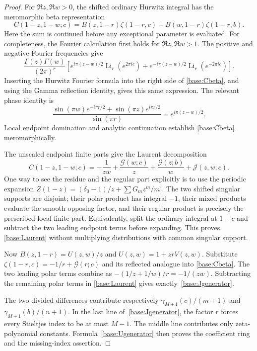 \begin{proof}
For $\Re z,\Re w>0$, the shifted ordinary Hurwitz integral has the
meromorphic beta representation
\begin{equation}\label{base:Cbeta}
 C(1-z,1-w;c)=B(z,1-r)\zeta(1-r,c)
                  +B(w,1-r)\zeta(1-r,b).
\end{equation}
Here the sum is continued before any exceptional parameter is evaluated.
For completeness, the Fourier calculation first holds for
$\Re z,\Re w>1$.  The positive and negative Fourier frequencies give
\[
 \frac{\Gamma(z)\Gamma(w)}{(2\pi)^r}
 \left[e^{i\pi(z-w)/2}\operatorname{Li}_r(e^{2\pi ic})
       +e^{-i\pi(z-w)/2}\operatorname{Li}_r(e^{-2\pi ic})\right].
\]
Inserting the Hurwitz Fourier formula into the right side of
\eqref{base:Cbeta}, and using the Gamma reflection identity, gives this
same expression.  The relevant phase identity is
\[
 \frac{\sin(\pi w)e^{-i\pi r/2}
             +\sin(\pi z)e^{i\pi r/2}}{\sin(\pi r)}
       =e^{i\pi(z-w)/2}.
\]
Local endpoint domination and analytic continuation establish
\eqref{base:Cbeta} meromorphically.

The unscaled endpoint finite parts give the Laurent decomposition
\begin{equation}\label{base:Laurent}
 C(1-z,1-w;c)=-\frac1{zw}
    +\frac{\mathcal G(w;c)}z
    +\frac{\mathcal G(z;b)}w+\mathcal J(z,w;c).
\end{equation}
One way to see the residue and the regular part explicitly is to use
the periodic expansion
$Z(1-z)=(\delta_0-1)/z+\sum G_mz^m/m!$.
The two shifted singular supports are disjoint; their polar product
has integral $-1$, their mixed products evaluate the smooth opposing
factor, and their regular product is precisely the prescribed local
finite part.  Equivalently, split the ordinary integral at $1-c$ and
subtract the two leading endpoint terms before expanding.  This proves
\eqref{base:Laurent} without multiplying distributions with common
singular support.

Now $B(z,1-r)=U(z,w)/z$ and
$U(z,w)=1+zrV(z,w)$.  Substitute
$\zeta(1-r,c)=-1/r+\mathcal G(r;c)$ and its reflected analogue into
\eqref{base:Cbeta}.  The two leading polar terms combine as
$-(1/z+1/w)/r=-1/(zw)$.  Subtracting the remaining polar terms in
\eqref{base:Laurent} gives exactly~\eqref{base:Jgenerator}.

The two divided differences contribute respectively
$\gamma_{M+1}(c)/(m+1)$ and $\gamma_{M+1}(b)/(n+1)$.
In the last line of~\eqref{base:Jgenerator}, the factor $r$ forces every
Stieltjes index to be at most $M-1$.  The middle line contributes only
zeta-polynomial constants.  Formula~\eqref{base:Ugenerator} then proves
the coefficient ring and the missing-index assertion.
\end{proof}

